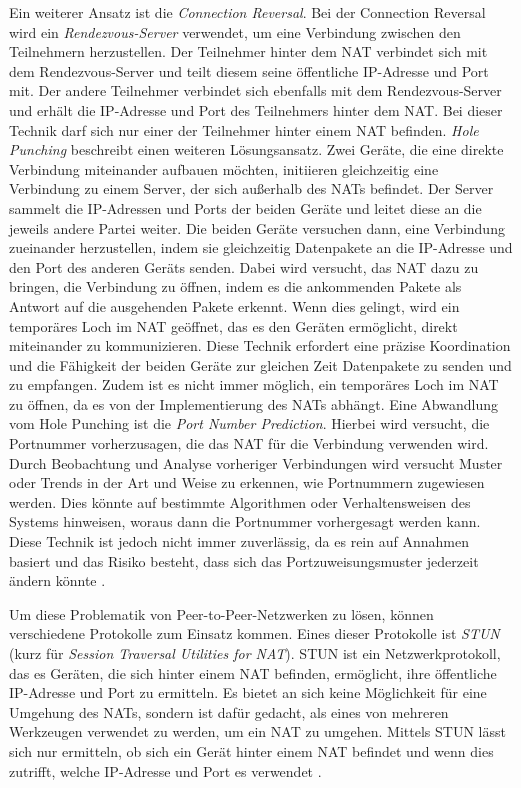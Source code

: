 Ein weiterer Ansatz ist die \textit{Connection Reversal}. Bei der Connection Reversal wird ein \textit{Rendezvous-Server} verwendet, um eine Verbindung zwischen den Teilnehmern herzustellen. Der Teilnehmer hinter dem NAT verbindet sich mit dem Rendezvous-Server und teilt diesem seine öffentliche IP-Adresse und Port mit. Der andere Teilnehmer verbindet sich ebenfalls mit dem Rendezvous-Server und erhält die IP-Adresse und Port des  Teilnehmers hinter dem NAT. Bei dieser Technik darf sich nur einer der Teilnehmer hinter einem NAT befinden.
\textit{Hole Punching} beschreibt einen weiteren Lösungsansatz. Zwei Geräte, die eine direkte Verbindung miteinander aufbauen möchten, initiieren gleichzeitig eine Verbindung zu einem Server, der sich außerhalb des NATs befindet. Der Server sammelt die IP-Adressen und Ports der beiden Geräte und leitet diese an die jeweils andere Partei weiter. Die beiden Geräte versuchen dann, eine Verbindung zueinander herzustellen, indem sie gleichzeitig Datenpakete an die IP-Adresse und den Port des anderen Geräts senden. Dabei wird versucht, das NAT dazu zu bringen, die Verbindung zu öffnen, indem es die ankommenden Pakete als Antwort auf die ausgehenden Pakete erkennt. Wenn dies gelingt, wird ein temporäres Loch im NAT geöffnet, das es den Geräten ermöglicht, direkt miteinander zu kommunizieren. Diese Technik erfordert eine präzise Koordination und die Fähigkeit der beiden Geräte zur gleichen Zeit Datenpakete zu senden und zu empfangen. Zudem ist es nicht immer möglich, ein temporäres Loch im NAT zu öffnen, da es von der Implementierung des NATs abhängt. Eine Abwandlung vom Hole Punching ist die \textit{Port Number Prediction}. Hierbei wird versucht, die Portnummer vorherzusagen, die das NAT für die Verbindung verwenden wird. Durch Beobachtung und Analyse vorheriger Verbindungen wird versucht Muster oder Trends in der Art und Weise zu erkennen, wie Portnummern zugewiesen werden. Dies könnte auf bestimmte Algorithmen oder Verhaltensweisen des Systems hinweisen, woraus dann die Portnummer vorhergesagt werden kann. Diese Technik ist jedoch nicht immer zuverlässig, da es rein auf Annahmen basiert und das Risiko besteht, dass sich das Portzuweisungsmuster jederzeit ändern könnte \Parencite[S. 7-21]{rfc5128_P2P_NATs}.

Um diese Problematik von Peer-to-Peer-Netzwerken zu lösen, können verschiedene Protokolle zum Einsatz kommen. Eines dieser Protokolle ist \textit{STUN} (kurz für \textit{Session Traversal Utilities for NAT}). STUN ist ein Netzwerkprotokoll, das es Geräten, die sich hinter einem NAT befinden, ermöglicht, ihre öffentliche IP-Adresse und Port zu ermitteln. Es bietet an sich keine Möglichkeit für eine Umgehung des NATs, sondern ist dafür gedacht, als eines von mehreren Werkzeugen verwendet zu werden, um ein NAT zu umgehen. Mittels STUN lässt sich nur ermitteln, ob sich ein Gerät hinter einem NAT befindet und wenn dies zutrifft, welche IP-Adresse und Port es verwendet \parencite[S. 4]{rfc8489_STUN}.

